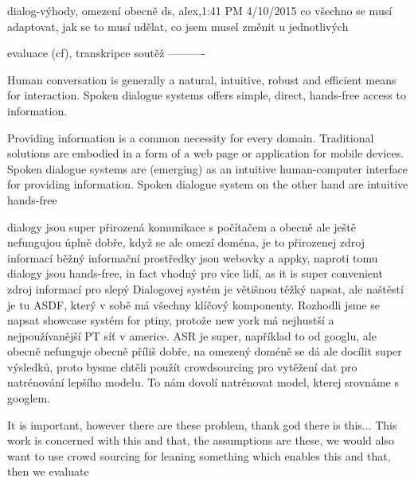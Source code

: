 dialog-výhody, omezení
obecně ds, alex,1:41 PM 4/10/2015 co všechno se musí adaptovat, jak se to musí udělat, co 
jsem musel změnit u jednotlivých

evaluace (cf), transkripce
soutěž
----------



Human conversation is generally a natural, intuitive, robust and efficient means for interaction.
Spoken dialogue systems offers simple, direct, hands-free access to information.






Providing information is a common necessity for every domain.
Traditional solutions are embodied in a form of a web page or application for mobile devices.
Spoken dialogue systems are (emerging) as an intuitive human-computer interface for providing information.
Spoken dialogue system on the other hand are intuitive hands-free



dialogy jsou super přirozená komunikace s počítačem a obecně ale ještě nefungujou úplně dobře,
když se ale omezí doména, je to přirozenej zdroj informací
běžný informační prostředky jsou webovky a appky, naproti tomu dialogy jsou hands-free, in fact vhodný pro více lidí, as it is super convenient zdroj informací pro slepý
Dialogovej systém je větišnou těžký napsat, ale naštěstí je tu ASDF, který v sobě má všechny klíčový komponenty.
Rozhodli jsme se napsat showcase systém for ptiny, protože new york má nejhustší a nejpoužívanější PT síť v americe.
ASR je super, například to od googlu, ale obecně nefunguje obecně příliš dobře, na omezený doméně se dá ale docílit super výsledků,
proto bysme chtěli použít crowdsourcing pro vytěžení dat pro natrénování lepšího modelu.
To nám dovolí natrénovat model, kterej srovnáme s googlem.

It is important, however there are these problem, thank god there is this...
This work is concerned with this and that, the assumptions are these, we would also want to use crowd sourcing for leaning something which enables this and that, then we evaluate

